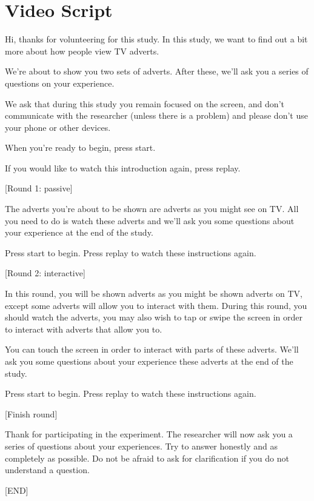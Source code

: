 \section{Video Script}

	Hi, thanks for volunteering for this study. In this study, we want to find out a bit more about how people view TV adverts. 

	We’re about to show you two sets of adverts. After these, we’ll ask you a series of questions on your experience.

	We ask that during this study you remain focused on the screen, and don’t communicate with the researcher (unless there is a problem) and please don’t use your phone or other devices.

	When you’re ready to begin, press start.

	If you would like to watch this introduction again, press replay.

	[Round 1: passive]

	The adverts you’re about to be shown are adverts as you might see on TV. All you need to do is watch these adverts and we’ll ask you some questions about your experience at the end of the study.

	Press start to begin.
	Press replay to watch these instructions again.

	[Round 2: interactive]

	In this round, you will be shown adverts as you might be shown adverts on TV, except some adverts will allow you to interact with them. During this round, you should watch the adverts, you may also wish to tap or swipe the screen in order to interact with adverts that allow you to. 

	You can touch the screen in order to interact with parts of these adverts. We’ll ask you some questions about your experience these adverts at the end of the study.

	Press start to begin.
	Press replay to watch these instructions again.

	[Finish round]

	Thank for participating in the experiment. The researcher will now ask you a series of questions about your experiences. Try to answer honestly and as completely as possible. Do not be afraid to ask for clarification if you do not understand a question.

	[END]
